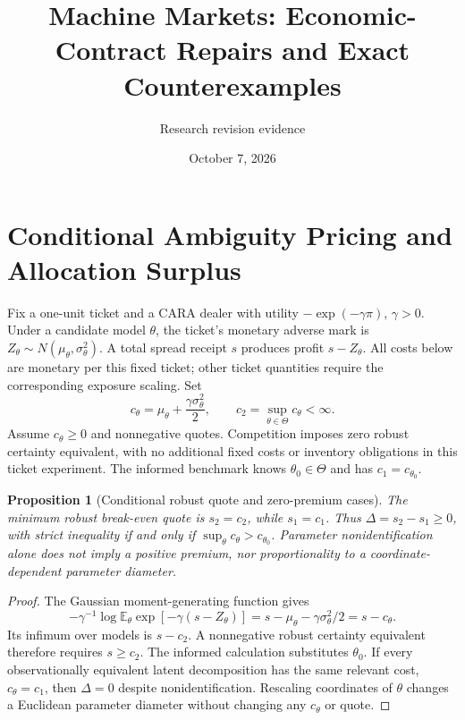\documentclass[11pt]{article}
\title{Machine Markets: Economic-Contract Repairs and Exact Counterexamples}
\author{Research revision evidence}\date{October 7, 2026}
\newtheorem{proposition}{Proposition}
\begin{document}
\maketitle

\section{Conditional Ambiguity Pricing and Allocation Surplus}
Fix a one-unit ticket and a CARA dealer with utility $-\exp(-\gamma\pi)$, $\gamma>0$. Under a candidate model $\theta$, the ticket's monetary adverse mark is $Z_\theta\sim N(\mu_\theta,\sigma_\theta^2)$. A total spread receipt $s$ produces profit $s-Z_\theta$. All costs below are monetary per this fixed ticket; other ticket quantities require the corresponding exposure scaling. Set
\[
c_\theta=\mu_\theta+\frac{\gamma\sigma_\theta^2}{2},\qquad
c_2=\sup_{\theta\in\Theta}c_\theta<\infty.
\]
Assume $c_\theta\ge0$ and nonnegative quotes. Competition imposes zero robust certainty equivalent, with no additional fixed costs or inventory obligations in this ticket experiment. The informed benchmark knows $\theta_0\in\Theta$ and has $c_1=c_{\theta_0}$.
\begin{proposition}[Conditional robust quote and zero-premium cases]
The minimum robust break-even quote is $s_2=c_2$, while $s_1=c_1$. Thus $\Delta=s_2-s_1\ge0$, with strict inequality if and only if $\sup_\theta c_\theta>c_{\theta_0}$. Parameter nonidentification alone does not imply a positive premium, nor proportionality to a coordinate-dependent parameter diameter.
\end{proposition}
\begin{proof}
The Gaussian moment-generating function gives
\[
-\gamma^{-1}\log\mathbb E_\theta\exp[-\gamma(s-Z_\theta)]
=s-\mu_\theta-\gamma\sigma_\theta^2/2=s-c_\theta.
\]
Its infimum over models is $s-c_2$. A nonnegative robust certainty equivalent therefore requires $s\ge c_2$. The informed calculation substitutes $\theta_0$. If every observationally equivalent latent decomposition has the same relevant cost, $c_\theta=c_1$, then $\Delta=0$ despite nonidentification. Rescaling coordinates of $\theta$ changes a Euclidean parameter diameter without changing any $c_\theta$ or quote.
\end{proof}
\end{document}
